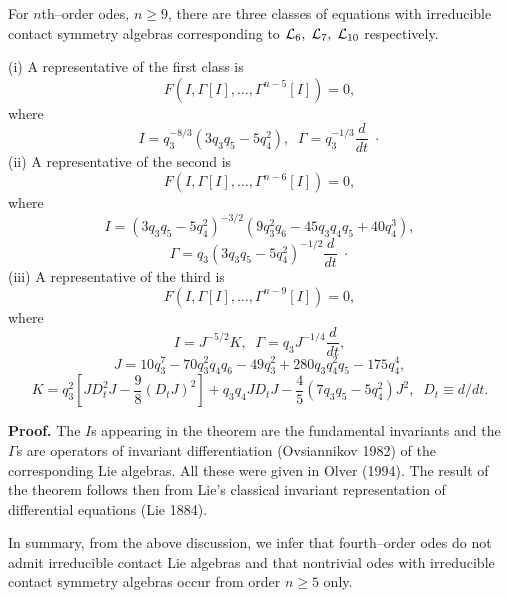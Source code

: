 \begin{theo}
\label{ch2:ncont}
\begin{em}
For $n$th--order odes, $n \ge 9$, there are three classes of equations with
irreducible contact symmetry algebras  corresponding to ${\cal L}_6,\;{\cal L}_7,\;
{\cal L}_{10}$ respectively.

(i) A representative of the first class is
\begin{equation}
\label{ch2:cs40}
F(I, \Gamma [I],\ldots , \Gamma^{n-5}[I])=0,
\end{equation}
where
\[ I=q_3^{-8/3} (3q_3q_5-5q_4^2),\;\;\Gamma=q_3^{-1/3}\frac{d}{dt}\;\cdot\]
(ii) A representative of the second is
\begin{equation}
\label{ch2:cs42}
F(I, \Gamma [I],\ldots ,\Gamma^{n-6}[I])=0,
\end{equation}
where
\[I=(3q_3q_5-5q_4^2)^{-3/2}(9q_3^2q_6-45q_3q_4q_5+40q_4^3),\]
\[\Gamma=q_3(3q_3q_5-5q_4^2)^{-1/2}\frac{d}{dt}\;\cdot\]
(iii) A representative of the third is
\begin{equation}
\label{ch2:cs43}
F(I, \Gamma [I],\ldots , \Gamma^{n-9}[I])=0,
\end{equation}
where
\[I=J^{-5/2}K,\;\;\Gamma=q_3J^{-1/4}\frac{d}{dt},\]
\[J=10q_3^7-70q_3^2q_4q_6-49q_3^2+280q_3q_4^2q_5-175q_4^4,\]
\[K=q_3^2[JD^2_tJ-\frac{9}{8}(D_t J)^2]+q_3q_4JD_tJ-\frac{4}{5}
(7q_3q_5-5q_4^2)J^2,\;\;D_t\equiv d/dt.\]

\end{em}
\end{theo}
{\bf Proof.} The $I$s appearing in the theorem are the fundamental invariants
and the $\Gamma$s  are operators of invariant differentiation
(Ovsiannikov 1982)
of the corresponding Lie algebras. All these were given in Olver (1994).
The result
of the theorem follows then from Lie's classical invariant
representation of differential equations (Lie 1884).

In summary, from the above discussion, we infer that fourth--order odes
do not admit irreducible contact Lie algebras and that nontrivial odes with
irreducible contact symmetry algebras occur from order $n\ge 5$ only.

